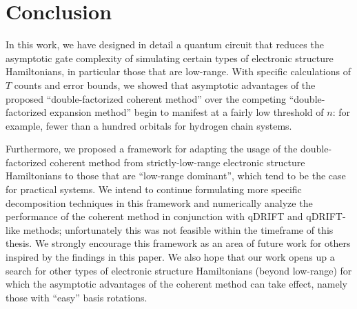 

\chapter{Conclusion}

In this work, we have designed in detail a quantum circuit that reduces the asymptotic gate complexity of simulating certain types of electronic structure Hamiltonians, in particular those that are low-range. With specific calculations of $T$ counts and error bounds, we showed that asymptotic advantages of the proposed ``double-factorized coherent method'' over the competing ``double-factorized expansion method'' begin to manifest at a fairly low threshold of $n$: for example, fewer than a hundred orbitals for hydrogen chain systems.

Furthermore, we proposed a framework for adapting the usage of the double-factorized coherent method from strictly-low-range electronic structure Hamiltonians to those that are ``low-range dominant'', which tend to be the case for practical systems. We intend to continue formulating more specific decomposition techniques in this framework and numerically analyze the performance of the coherent method in conjunction with qDRIFT and qDRIFT-like methods; unfortunately this was not feasible within the timeframe of this thesis. We strongly encourage this framework as an area of future work for others inspired by the findings in this paper. We also hope that our work opens up a search for other types of electronic structure Hamiltonians (beyond low-range) for which the asymptotic advantages of the coherent method can take effect, namely those with ``easy'' basis rotations.


